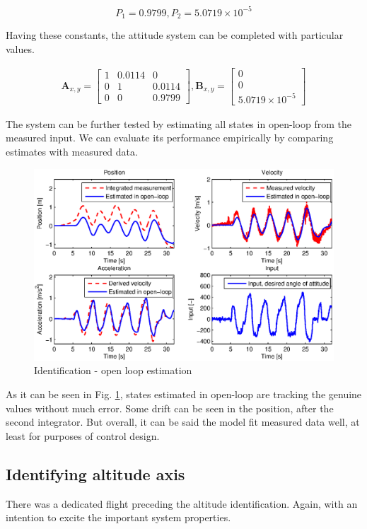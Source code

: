 \begin{equation}
P_1 = 0.9799, P_2 = 5.0719 \times 10^{-5} 
\label{eq:constants1}
\end{equation}

Having these constants, the attitude system can be completed with particular values. 

\begin{equation}
\begin{split}
\mathbf{A}_{x, y} = \begin{bmatrix}
1 & 0.0114 & 0 \\
0 & 1 & 0.0114 \\
0 & 0 & 0.9799
\end{bmatrix}, \mathbf{B}_{x, y} = \begin{bmatrix}
0\\
0\\
5.0719 \times 10^{-5}
\end{bmatrix}
\end{split}
\end{equation}

The system can be further tested by estimating all states in open-loop from the measured input. We can evaluate its performance empirically by comparing estimates with measured data.

\begin{figure}[h!]
\includegraphics[width=1\textwidth]{fig/iden2.eps} 
\caption{Identification - open loop estimation}
\label{fig:iden2}
\end{figure}

As it can be seen in Fig. \ref{fig:iden2}, states estimated in open-loop are tracking the genuine values without much error. Some drift can be seen in the position, after the second integrator. But overall, it can be said the model fit measured data well, at least for purposes of control design. 

\subsection{Identifying altitude axis}

There was a dedicated flight preceding the altitude identification. Again, with an intention to excite the important system properties.
